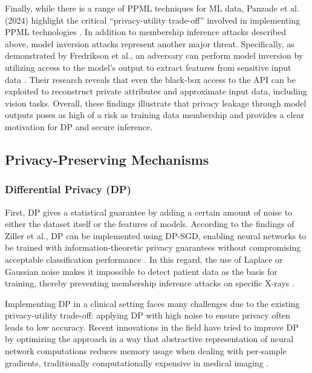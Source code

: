 \documentclass[conference]{IEEEtran}
\begin{document}
Finally, while there is a range of PPML techniques for ML data, Panzade et al. (2024) highlight the critical ``privacy-utility trade-off'' involved in implementing PPML technologies \cite{panzade}. In addition to membership inference attacks described above, model inversion attacks represent another major threat. Specifically, as demonstrated by Fredrikson et al., an adversary can perform model inversion by utilizing access to the model's output to extract features from sensitive input data \cite{fredrikson}. Their research reveals that even the black-box access to the API can be exploited to reconstruct private attributes and approximate input data, including vision tasks. Overall, these findings illustrate that privacy leakage through model outputs poses as high of a risk as training data membership and provides a clear motivation for DP and secure inference.

\subsection{Privacy-Preserving Mechanisms}
\subsubsection{Differential Privacy (DP)}
First, DP gives a statistical guarantee by adding a certain amount of noise to either the dataset itself or the features of models. According to the findings of Ziller et al., DP can be implemented using DP-SGD, enabling neural networks to be trained with information-theoretic privacy guarantees without compromising acceptable classification performance \cite{ziller}. In this regard, the use of Laplace or Gaussian noise makes it impossible to detect patient data as the basis for training, thereby preventing membership inference attacks on specific X-rays \cite{ziller}.

Implementing DP in a clinical setting faces many challenges due to the existing privacy-utility trade-off: applying DP with high noise to ensure privacy often leads to low accuracy. Recent innovations in the field have tried to improve DP by optimizing the approach in a way that abstractive representation of neural network computations reduces memory usage when dealing with per-sample gradients, traditionally computationally expensive in medical imaging \cite{ziller}.
\end{document}
